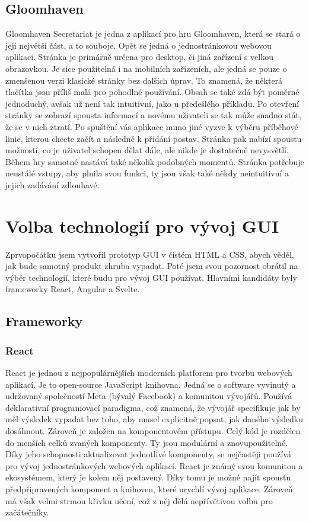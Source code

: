 \subsection{Gloomhaven}
Gloomhaven Secretariat je jedna z aplikací pro hru Gloomhaven, která se stará o její největší část, a to souboje. Opět se jedná o jednostránkovou webovou aplikaci. Stránka je primárně určena pro desktop, či jiná zařízení s velkou obrazovkou. Je sice použitelná i na mobilních zařízeních, ale jedná se pouze o zmenšenou verzi klasické stránky bez dalších úprav. To znamená, že některá tlačítka jsou příliš malá pro pohodlné používání. Obsah se také zdá být poměrné jednoduchý, avšak už není tak intuitivní, jako u předešlého příkladu. Po otevření stránky se zobrazí spousta informací a novému uživateli se tak může snadno stát, že se v nich ztratí. Po spuštění vás aplikace mimo jiné vyzve k výběru příběhové linie, kterou chcete začít a následně k přidání postav. Stránka pak nabízí spoustu možností, co je uživatel schopen dělat dále, ale nikde je dostatečně nevysvětlí. Během hry samotné nastává také několik podobných momentů. Stránka potřebuje neustálé vstupy, aby plnila svou funkci, ty jsou však také někdy neintuitivní a jejich zadávání zdlouhavé.

\section{Volba technologií pro vývoj GUI}
Zprvopočátku jsem vytvořil prototyp GUI v čistém HTML a CSS, abych věděl, jak bude samotný produkt zhruba vypadat. Poté jsem svou pozornost obrátil na výběr technologií, které budu pro vývoj GUI používat. Hlavními kandidáty byly frameworky React, Angular a Svelte.

\subsection{Frameworky}

\subsubsection{React}
React je jednou z nejpopulárnějších moderních platforem pro tvorbu webových aplikací. Je to open-source JavaScript knihovna. Jedná se o software vyvinutý a udržovaný společností Meta (bývalý Facebook) a komunitou vývojářů. Používá deklarativní programovací paradigma, což znamená, že vývojář specifikuje jak by měl výsledek vypadat bez toho, aby musel explicitně popsat, jak daného výsledku dosáhnout. Zároveň je založen na komponentovém přístupu. Celý kód je rozdělen do menších celků zvaných komponenty. Ty jsou modulární a znovupoužitelné. Díky jeho schopnosti aktualizovat jednotlivé komponenty, se nejčastěji používá pro vývoj jednostránkových webových aplikací. React je známý svou komunitou a ekosystémem, který je kolem něj postavený. Díky tomu je možné najít spoustu předpřipravených komponent a knihoven, které urychlí vývoj aplikace. Zároveň má však velmi strmou křivku učení, což z něj dělá nepřívětivou volbu pro začátečníky.

